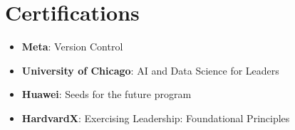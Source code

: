 \documentclass[letterpaper,11pt]{article}
\newcommand{\resumeItem}[2]{
  \item\small{
    \textbf{#1}{#2 \vspace{-2pt}}
  }
}
\newcommand{\resumeSubItem}[2]{\resumeItem{#1}{#2}\vspace{-4pt}}
\newcommand{\resumeSubItemcol}[2]{\resumeItem{#1}{#2}\vspace{-8pt}}
\newcommand{\resumeSubHeadingListStart}{\begin{itemize}[leftmargin=*]}
\newcommand{\resumeSubHeadingListEnd}{\end{itemize}}
\begin{document}

\section{Certifications}
\vspace{-15pt}
  \begin{multicols}{2}
    \resumeSubHeadingListStart
    \resumeSubItemcol{Meta}{: Version Control}
    \resumeSubItemcol{University of Chicago}{: AI and Data Science for Leaders}
    \resumeSubItemcol{Huawei}{: Seeds for the future program}
    \resumeSubItemcol{HardvardX}{: Exercising Leadership: Foundational Principles}
  \resumeSubHeadingListEnd
  \end{multicols}
\end{document}
